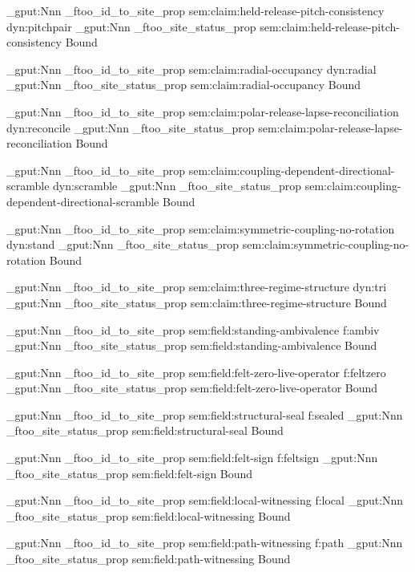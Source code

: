 \prop_gput:Nnn \g_ftoo_id_to_site_prop { sem:claim:held-release-pitch-consistency } { dyn:pitchpair }
\prop_gput:Nnn \g_ftoo_site_status_prop { sem:claim:held-release-pitch-consistency } { Bound }

\prop_gput:Nnn \g_ftoo_id_to_site_prop { sem:claim:radial-occupancy } { dyn:radial }
\prop_gput:Nnn \g_ftoo_site_status_prop { sem:claim:radial-occupancy } { Bound }

\prop_gput:Nnn \g_ftoo_id_to_site_prop { sem:claim:polar-release-lapse-reconciliation } { dyn:reconcile }
\prop_gput:Nnn \g_ftoo_site_status_prop { sem:claim:polar-release-lapse-reconciliation } { Bound }

\prop_gput:Nnn \g_ftoo_id_to_site_prop { sem:claim:coupling-dependent-directional-scramble } { dyn:scramble }
\prop_gput:Nnn \g_ftoo_site_status_prop { sem:claim:coupling-dependent-directional-scramble } { Bound }

\prop_gput:Nnn \g_ftoo_id_to_site_prop { sem:claim:symmetric-coupling-no-rotation } { dyn:stand }
\prop_gput:Nnn \g_ftoo_site_status_prop { sem:claim:symmetric-coupling-no-rotation } { Bound }

\prop_gput:Nnn \g_ftoo_id_to_site_prop { sem:claim:three-regime-structure } { dyn:tri }
\prop_gput:Nnn \g_ftoo_site_status_prop { sem:claim:three-regime-structure } { Bound }

\prop_gput:Nnn \g_ftoo_id_to_site_prop { sem:field:standing-ambivalence } { f:ambiv }
\prop_gput:Nnn \g_ftoo_site_status_prop { sem:field:standing-ambivalence } { Bound }

\prop_gput:Nnn \g_ftoo_id_to_site_prop { sem:field:felt-zero-live-operator } { f:feltzero }
\prop_gput:Nnn \g_ftoo_site_status_prop { sem:field:felt-zero-live-operator } { Bound }

\prop_gput:Nnn \g_ftoo_id_to_site_prop { sem:field:structural-seal } { f:sealed }
\prop_gput:Nnn \g_ftoo_site_status_prop { sem:field:structural-seal } { Bound }

\prop_gput:Nnn \g_ftoo_id_to_site_prop { sem:field:felt-sign } { f:feltsign }
\prop_gput:Nnn \g_ftoo_site_status_prop { sem:field:felt-sign } { Bound }

\prop_gput:Nnn \g_ftoo_id_to_site_prop { sem:field:local-witnessing } { f:local }
\prop_gput:Nnn \g_ftoo_site_status_prop { sem:field:local-witnessing } { Bound }

\prop_gput:Nnn \g_ftoo_id_to_site_prop { sem:field:path-witnessing } { f:path }
\prop_gput:Nnn \g_ftoo_site_status_prop { sem:field:path-witnessing } { Bound }

